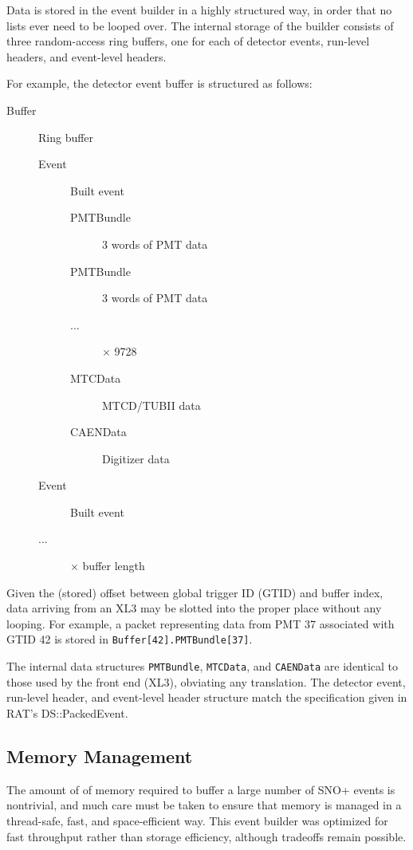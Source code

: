\documentclass[11pt,twocolumn]{article}
\begin{document}
Data is stored in the event builder in a highly structured way, in order that no lists ever need to be looped over. The internal storage of the builder consists of three random-access ring buffers, one for each of detector events, run-level headers, and event-level headers.

For example, the detector event buffer is structured as follows:
\begin{description}
\item[Buffer] Ring buffer
\begin{description}
\item[Event] Built event
\begin{description}
\item[PMTBundle] 3 words of PMT data
\item[PMTBundle] 3 words of PMT data
\item[ ...] $\times$ 9728 
\item[MTCData] MTCD/TUBII data
\item[CAENData] Digitizer data
\end{description}
\item[Event] Built event
\item[...] $\times$ buffer length
\end{description}
\end{description}
Given the (stored) offset between global trigger ID (GTID) and buffer index, data arriving from an XL3 may be slotted into the proper place without any looping. For example, a packet representing data from PMT 37 associated with GTID 42 is stored in {\tt Buffer[42].PMTBundle[37]}.

The internal data structures {\tt PMTBundle}, {\tt MTCData}, and {\tt CAENData} are identical to those used by the front end (XL3), obviating any translation. The detector event, run-level header, and event-level header structure match the specification given in RAT's DS::PackedEvent.

\subsection{Memory Management}
The amount of of memory required to buffer a large number of SNO+ events is nontrivial, and much care must be taken to ensure that memory is managed in a thread-safe, fast, and space-efficient way. This event builder was optimized for fast throughput rather than storage efficiency, although tradeoffs remain possible.
\end{document}
